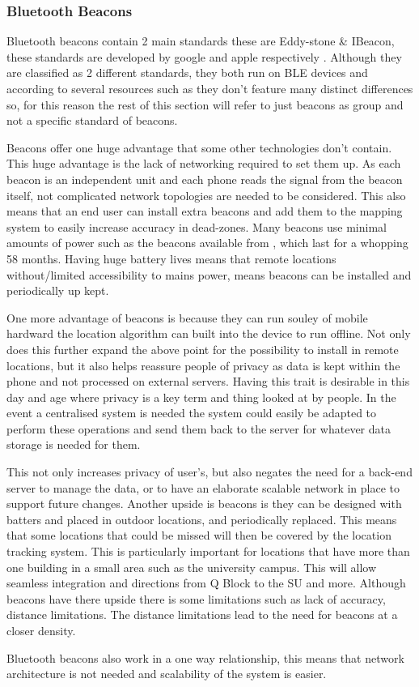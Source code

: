 \subsubsection{Bluetooth Beacons}
Bluetooth beacons contain 2 main standards these are Eddy-stone \& IBeacon, these standards are developed by google and apple respectively \citetemp. Although they are classified as 2 different standards, they both run on BLE devices and according to several resources such as \citetemp they don’t feature many distinct differences so, for this reason the rest of this section will refer to just beacons as group and not a specific standard of beacons.

Beacons offer one huge advantage that some other technologies don't contain. This huge advantage is the lack of networking required to set them up. As each beacon is an independent unit and each phone reads the signal from the beacon itself, not complicated network topologies are needed to be considered. This also means that an end user can install extra beacons and add them to the mapping system to easily increase accuracy in dead-zones. Many beacons use minimal amounts of power such as the beacons available from \citetemp, which last for a whopping  58 months. Having huge battery lives means that remote locations without/limited accessibility to mains power, means beacons can be installed and periodically up kept.

One more advantage of beacons is because they can run souley of mobile hardward the location algorithm can built into the device to run offline. Not only does this further expand the above point for the possibility to install in remote locations, but it also helps reassure people of privacy as data is kept within the phone and not processed on external servers. Having this trait is desirable in this day and age where privacy is a key term and thing looked at by people. In the event a centralised system is needed the system could easily be adapted to perform these operations and send them back to the server for whatever data storage is needed for them.


This not only increases privacy of user’s, but also negates the need for a back-end server to manage the data, or to have an elaborate scalable network in place to support future changes. 
Another upside is beacons is they can be designed with batters and placed in outdoor locations, and periodically replaced. This means that some locations that could be missed will then be covered by the location tracking system. This is particularly important for locations that have more than one building in a small area such as the university campus. This will allow seamless integration and directions from Q Block to the SU and more.
Although beacons have there upside there is some limitations such as lack of accuracy, distance limitations. The distance limitations lead to the need for beacons at a closer density.

Bluetooth beacons also work in a one way relationship, this means that network architecture is not needed and scalability of the system is easier.
